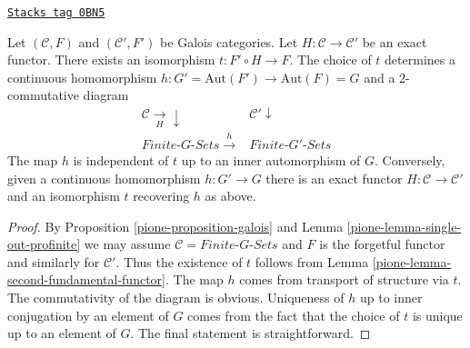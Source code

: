 \begin{lemma}
\label{pione-lemma-functoriality-galois}
\href{https://stacks.math.columbia.edu/tag/0BN5}{\texttt{Stacks tag 0BN5}}

Let $(\mathcal{C}, F)$ and $(\mathcal{C}', F')$ be Galois categories.
Let $H : \mathcal{C} \to \mathcal{C}'$ be an exact functor.
There exists an isomorphism $t : F' \circ H \to F$.
The choice of $t$ determines a continuous homomorphism
$h : G' = \text{Aut}(F') \to \text{Aut}(F) = G$ and
a $2$-commutative diagram
$$
\begin{array}{cc}\mathcal{C} \underset{H}{\longrightarrow}\downarrow & \mathcal{C}' \downarrow \\ \textit{Finite-}G\textit{-Sets} \overset{h}{\longrightarrow} & \textit{Finite-}G'\textit{-Sets}\end{array}
$$
The map $h$ is independent of $t$ up
to an inner automorphism of $G$.
Conversely, given a continuous homomorphism $h : G' \to G$ there
is an exact functor $H : \mathcal{C} \to \mathcal{C}'$ and an
isomorphism $t$ recovering $h$ as above.
\end{lemma}

\begin{proof}

By Proposition \ref{pione-proposition-galois} and
Lemma \ref{pione-lemma-single-out-profinite} we may assume
$\mathcal{C} = \textit{Finite-}G\textit{-Sets}$ and $F$ is the
forgetful functor and similarly for $\mathcal{C}'$. Thus the existence of
$t$ follows from Lemma \ref{pione-lemma-second-fundamental-functor}. The map $h$
comes from transport of structure via $t$. The commutativity of the
diagram is obvious. Uniqueness of $h$ up to inner conjugation by
an element of $G$ comes from the fact that the choice of $t$ is
unique up to an element of $G$. The final statement is straightforward.
\end{proof}

